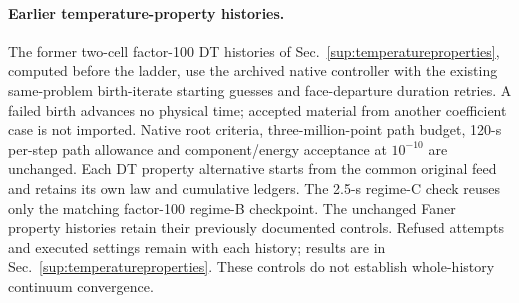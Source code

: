\paragraph{Earlier temperature-property histories.}
\label{sup:numericalcontrols:properties}
The former two-cell factor-100 DT histories of
Sec.~\ref{sup:temperatureproperties}, computed before the ladder, use the archived native controller
with the existing same-problem birth-iterate starting guesses and
face-departure duration retries. A failed birth advances no physical
time; accepted material from another coefficient case is not imported.
Native root criteria, three-million-point path budget, 120-s per-step
path allowance and component/energy acceptance at $10^{-10}$ are
unchanged. Each DT property alternative starts from the common original
feed and retains its own law and cumulative ledgers. The 2.5-s regime-C
check reuses only the matching factor-100 regime-B checkpoint.
The unchanged Faner property histories retain their previously
documented controls. Refused attempts and executed settings remain
with each history; results are in Sec.~\ref{sup:temperatureproperties}.
These controls do not establish whole-history continuum convergence.
